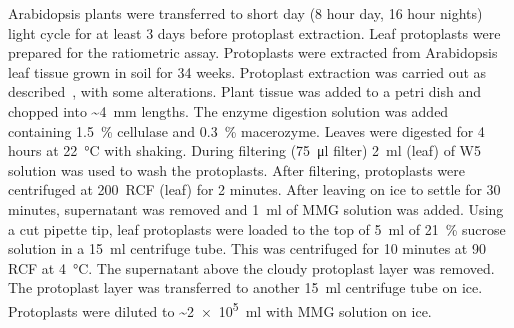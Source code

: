 \documentclass[../main.tex]{subfiles}
\begin{document}
Arabidopsis plants were transferred to short day (8 hour day, 16 hour nights) light cycle for at least 3 days before protoplast extraction.
Leaf protoplasts were prepared for the ratiometric assay.
Protoplasts were extracted from Arabidopsis leaf tissue grown in soil for 3\textendash{}4 weeks.
Protoplast extraction was carried out as described~\autocite{yooArabidopsisMesophyllProtoplasts2007}, with some alterations.
Plant tissue was added to a petri dish and chopped into \textasciitilde{}\SI{4}{\mm} lengths.
The enzyme digestion solution was added containing \SI{1.5}{\percent} cellulase and \SI{0.3}{\percent} macerozyme.
Leaves were digested for 4 hours at \SI{22}{\degreeCelsius} with shaking.
During filtering (\SI{75}{\micro\litre} filter) \SI{2}{\ml} (leaf) of W5 solution was used to wash the protoplasts.
After filtering, protoplasts were centrifuged at 200~RCF (leaf) for 2 minutes.
After leaving on ice to settle for 30 minutes, supernatant was removed and \SI{1}{\ml} of MMG solution was added.
Using a cut pipette tip, leaf protoplasts were loaded to the top of \SI{5}{\ml} of \SI{21}{\percent} sucrose solution in a \SI{15}{\ml} centrifuge tube.
This was centrifuged for 10 minutes at 90 RCF at \SI{4}{\degreeCelsius}.
The supernatant above the cloudy protoplast layer was removed.
The protoplast layer was transferred to another \SI{15}{\ml} centrifuge tube on ice.
Protoplasts were diluted to \textasciitilde{}\SI{2e5}{\ml} with MMG solution on ice.
\end{document}
